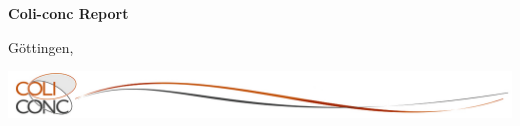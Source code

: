 \documentclass[12pt,        %
  english,ngerman,          %
  paper=a4,                 %
  captions=tablesignature,  %
  listof=numbered,          %
  bibliography=totoc,       %
  headings=small,           %
  headinclude=false,        %
  footinclude=false,        %
  parskip=half-,            %
  oneside,                  %
  DIV=12                    %
]{styles/colireport}
\begin{document}
\begin{titlepage}
\begin{center}
{    \Huge
    \bfseries
    \textcolor{vzgblue}{
    Coli-conc Report
}
\Large
\bfseries
\textcolor{vzgblue}{
	\colireportlang \colireportno
}

\vspace{1.25cm}
      
      \huge
      \mdseries
        \colititle
    }

    \vfill

    {
      \normalsize

      \vfill
      \vfill
      
      Göttingen, \colidate
    }
      
      \vfill
      
    {

    \includegraphics[scale=0.3]{basics/coli-conc-wave.png}

    }
  \end{center}
\end{titlepage}




\LARGE
\textbf{{\colititle}}
\end{document}
